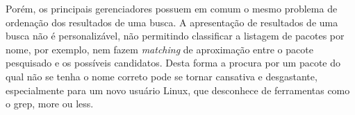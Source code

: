 Porém, os principais gerenciadores possuem em comum o mesmo problema de ordenação dos resultados de uma busca. A apresentação de resultados de uma busca não é personalizável, não permitindo classificar a listagem de pacotes por nome, por exemplo, nem fazem \textit{matching} de aproximação  entre o pacote pesquisado e os possíveis candidatos. Desta forma a procura por um pacote do qual não se tenha o nome correto pode se tornar cansativa e desgastante, especialmente para um novo usuário Linux, que desconhece de ferramentas como o {\code grep, more} ou {\code  less}. 


